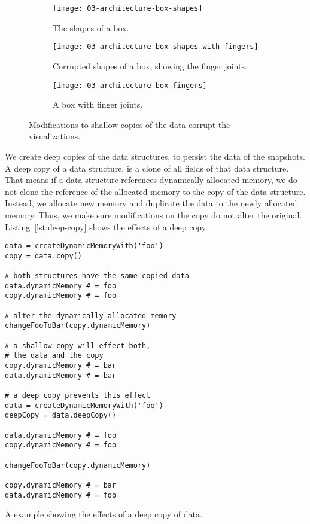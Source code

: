 \documentclass[../ClassicThesis.tex]{subfiles}
\begin{document}
\begin{figure}[h]
  \centering
  \begin{subfigure}[a]{0.3222\textwidth}
    \texttt{[image: 03-architecture-box-shapes]}
    \caption{The shapes of a box.}
    \label{fig:corrupt:shapes}
  \end{subfigure}
  \begin{subfigure}[b]{0.3222\textwidth}
    \texttt{[image: 03-architecture-box-shapes-with-fingers]}
    \caption{Corrupted shapes of a box, showing the finger joints.}
    \label{fig:corrupt:shapes-fingers}
  \end{subfigure}
  \begin{subfigure}[c]{0.3222\textwidth}
    \texttt{[image: 03-architecture-box-fingers]}
    \caption{A box with finger joints.}
    \label{fig:corrupt:fingers}
  \end{subfigure}
  \caption{Modifications to shallow copies of the data
    corrupt the visualizations.}
  \label{fig:corrupt}
\end{figure}

We create deep copies of the data structures, to persist the
data of the snapshots. A deep copy of a data structure, is a
clone of all fields of that data structure. That means if a
data structure references dynamically allocated memory, we
do not clone the reference of the allocated memory to the
copy of the data structure. Instead, we allocate new memory
and duplicate the data to the newly allocated memory. Thus,
we make sure modifications on the copy do not alter the
original. Listing~\ref{lst:deep-copy} shows the effects of a
deep copy.

\begin{listing}[h]
\begin{verbatim}
data = createDynamicMemoryWith('foo')
copy = data.copy()

# both structures have the same copied data
data.dynamicMemory # = foo
copy.dynamicMemory # = foo

# alter the dynamically allocated memory
changeFooToBar(copy.dynamicMemory)

# a shallow copy will effect both,
# the data and the copy
copy.dynamicMemory # = bar
data.dynamicMemory # = bar

# a deep copy prevents this effect
data = createDynamicMemoryWith('foo')
deepCopy = data.deepCopy()

data.dynamicMemory # = foo
copy.dynamicMemory # = foo

changeFooToBar(copy.dynamicMemory)

copy.dynamicMemory # = bar
data.dynamicMemory # = foo
\end{verbatim}
\caption{A {\coffeescript} example showing the effects of a deep copy
  of data.}
\label{lst:deep-copy}
\end{listing}
\end{document}
